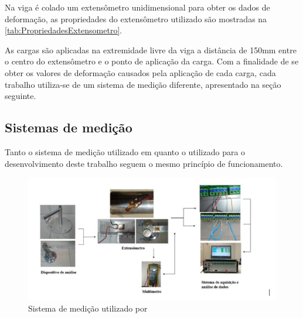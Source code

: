 Na viga é colado um extensômetro unidimensional para obter os dados de deformação, as propriedades do extensômetro utilizado são mostradas na
\autoref{tab:PropriedadesExtensometro}.

\begin{table}[htb]
\caption[]{Propriedades do extensômetro colado ao dispositivo de flexão}
\label{tab:PropriedadesExtensometro}
\end{table}

As cargas são aplicadas na extremidade livre da viga a distância de 150mm entre o centro do extensômetro e o ponto de aplicação da carga.
Com a finalidade de se obter os valores de deformação causados pela aplicação de cada carga, cada trabalho utiliza-se de um sistema de medição diferente, apresentado
na seção seguinte.

\subsection{Sistemas de medição}

Tanto o sistema de medição utilizado em \autocite{Minela2017} quanto o utilizado para o desenvolvimento deste trabalho seguem o mesmo princípio de funcionamento.

\begin{figure}[htb]
	\caption{\label{fig:2050} Sistema de medição utilizado por \autocite{Minela2017}}
	\begin{center}
		\includegraphics[width=\textwidth]{pictures/2050.png}
	\end{center}
\end{figure}

